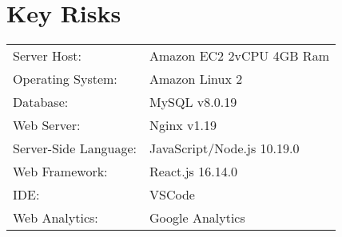 \section{Key Risks}

\begin{tabular}{ l l }
Server Host:			& Amazon EC2 2vCPU 4GB Ram\\
Operating System:		& Amazon Linux 2\\
Database:				& MySQL v8.0.19\\
Web Server:				& Nginx v1.19\\
Server-Side Language:	& JavaScript/Node.js 10.19.0\\
Web Framework:			& React.js 16.14.0\\
IDE:					& VSCode\\
Web Analytics:			& Google Analytics
\end{tabular}